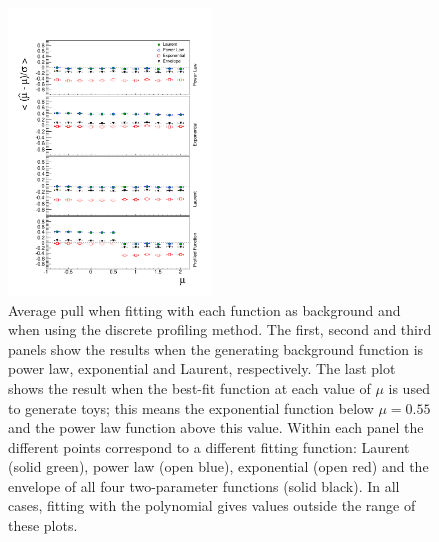 %
\begin{figure}[tbp]
\centering
\includegraphics[width=0.48\textwidth]{functions/FirstOrderFunctions.pdf}
\caption{Average pull when fitting with each function as background and when
using the discrete profiling method. The first, second and third panels show the results
when the generating background function is power law, exponential and Laurent,
respectively. The last plot shows the result when the best-fit function at each
value of $\mu$ is used to generate toys; this means the exponential function
below $\mu = 0.55$ and the power law function above this value. Within each panel the different
points correspond to a different fitting function: Laurent (solid green), power law (open blue), exponential (open red) and the envelope of all four two-parameter functions (solid black). In all cases,
fitting with the polynomial gives values outside the range of these plots.}
\label{fig:functions:firstorderbias}
\end{figure}

